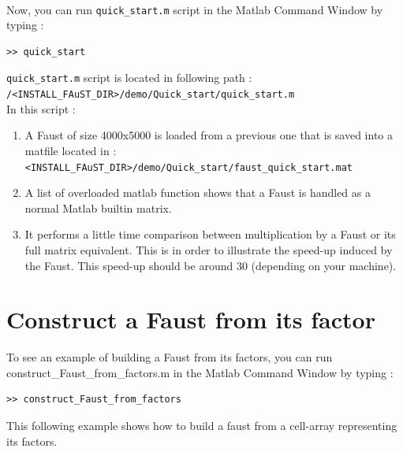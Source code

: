 \paragraph{} Now, you can run \texttt{quick\_start.m} script in the Matlab Command Window by typing :
\lstset{style=customMatlab}
\begin{lstlisting}
>> quick_start
\end{lstlisting}
\texttt{quick\_start.m} script is located in following path :\\
\texttt{/<INSTALL\_FAuST\_DIR>/demo/Quick\_start/quick\_start.m} \\
In this script :
\begin{enumerate} 
	\item A Faust of size 4000x5000 is loaded from a previous one that is saved into a matfile located in :\\
	\texttt{<INSTALL\_FAuST\_DIR>/demo/Quick\_start/faust\_quick\_start.mat}
	
	
	\item  A list of overloaded matlab function shows that a Faust is handled as a normal Matlab builtin matrix.
 	

	\item It performs a little time comparison between multiplication by a Faust or its full matrix equivalent.
This is in order to illustrate the speed-up induced by the Faust. This speed-up should be around 30 (depending on your machine).
	
\end{enumerate}


\section{Construct a Faust from its factor}\label{sec:firstUseBuildFactors}
To see an example of building a Faust from its factors, you can run construct\_Faust\_from\_factors.m in the Matlab Command Window by typing :
\lstset{style=customMatlab}
\begin{lstlisting}
>> construct_Faust_from_factors
\end{lstlisting}
This following example shows how to build a faust from a cell-array representing its factors.


